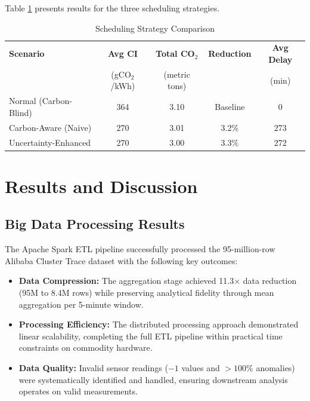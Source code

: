 \documentclass[12pt]{report}
\begin{document}
Table \ref{tab:scheduling_results} presents results for the three scheduling strategies.

\begin{table}[H]
\centering
\caption{Scheduling Strategy Comparison}
\label{tab:scheduling_results}
\begin{tabular}{lcccc}
\toprule
\textbf{Scenario} & \textbf{Avg CI} & \textbf{Total CO$_2$} & \textbf{Reduction} & \textbf{Avg Delay} \\
 & (gCO$_2$/kWh) & (metric tons) & & (min) \\
\midrule
Normal (Carbon-Blind) & 364 & 3.10 & Baseline & 0 \\
Carbon-Aware (Naive) & 270 & 3.01 & 3.2\% & 273 \\
Uncertainty-Enhanced & 270 & 3.00 & 3.3\% & 272 \\
\bottomrule
\end{tabular}
\end{table}



\chapter{Results and Discussion}

\section{Big Data Processing Results}

The Apache Spark ETL pipeline successfully processed the 95-million-row Alibaba Cluster Trace dataset with the following key outcomes:

\begin{itemize}
    \item \textbf{Data Compression:} The aggregation stage achieved 11.3$\times$ data reduction (95M to 8.4M rows) while preserving analytical fidelity through mean aggregation per 5-minute window.
    
    \item \textbf{Processing Efficiency:} The distributed processing approach demonstrated linear scalability, completing the full ETL pipeline within practical time constraints on commodity hardware.
    
    \item \textbf{Data Quality:} Invalid sensor readings ($-1$ values and $>100\%$ anomalies) were systematically identified and handled, ensuring downstream analysis operates on valid measurements.
\end{itemize}
\end{document}
